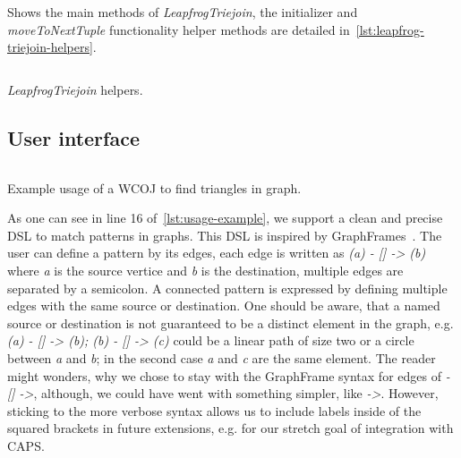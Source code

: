 \begin{listing}[H]
    \inputminted[mathescape, linenos=true]{scala}{code/LeapfrogTriejoinIdiomatic.scala}
    \caption{Shows the main methods of \textit{LeapfrogTriejoin}, the initializer and \textit{moveToNextTuple} functionality
    helper methods are detailed in~\cref{lst:leapfrog-triejoin-helpers}.}
    \label{lst:leapfrog-triejoin}
\end{listing}

\begin{listing}[H]
    \inputminted{scala}{code/LeapfrogTriejoinHelpers.scala}
    \caption{\textit{LeapfrogTriejoin} helpers.}
    \label{lst:leapfrog-triejoin-helpers}
\end{listing}



\subsection{User interface}\label{subsec:user-interface}
\begin{listing}[H]
    \inputminted{scala}{code/usage-example.scala}
    \caption{Example usage of a WCOJ to find triangles in graph.}
    \label{lst:usage-example}
\end{listing}

As one can see in line 16 %
of~\cref{lst:usage-example}, we support a clean and precise DSL to match patterns in graphs.
This DSL is inspired by GraphFrames~\cite{graph-frames}.
The user can define a pattern by its edges, each edge is written as \textit{(a) - [] -> (b)} where \textit{a} is the
source vertice and \textit{b} is the destination, multiple edges are separated by a semicolon.
A connected pattern is expressed by defining multiple edges with the same source or destination.
One should be aware, that a named source or destination is not guaranteed to be a distinct element in the graph,
e.g. \textit{(a) - [] -> (b); (b) - [] -> (c)} could be a linear path of size two or a circle between \textit{a} and
\textit{b}; in the second case \textit{a} and \textit{c} are the same element.
The reader might wonders, why we chose to stay with the GraphFrame syntax for edges of
\textit{- [] ->}, although, we could have went with something simpler, like \textit{->}.
However, sticking to the more verbose syntax allows us to include labels inside of the squared brackets
in future extensions, e.g. for our stretch goal of integration with CAPS.


